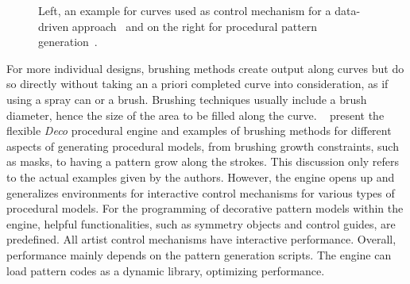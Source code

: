 \begin{figure}[H]
    \centering
    \caption{\label{fig:curves} Left, an example for curves used as control mechanism for a data-driven approach~\cite{lu_2014_dds} and on the right for procedural pattern generation~\cite{mech_2012_tdf}.}
\end{figure}

For more individual designs, brushing methods create output along curves but do so directly without taking an a priori completed curve into consideration, as if using a spray can or a brush. Brushing techniques usually include a brush diameter, hence the size of the area to be filled along the curve. \citeauthor*{mech_2012_tdf}~\cite{mech_2012_tdf} present the flexible \textit{Deco} procedural engine and examples of brushing methods for different aspects of generating procedural models, from brushing growth constraints, such as masks, to having a pattern grow along the strokes. This discussion only refers to the actual examples given by the authors. However, the engine opens up and generalizes environments for interactive control mechanisms for various types of procedural models. For the programming of decorative pattern models within the engine, helpful functionalities, such as symmetry objects and control guides, are predefined. All artist control mechanisms have interactive performance. Overall, performance mainly depends on the pattern generation scripts. The engine can load pattern codes as a dynamic library, optimizing performance. 

